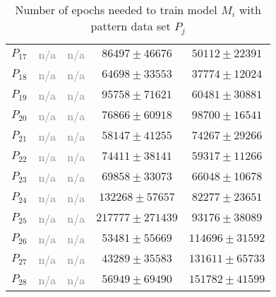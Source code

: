 \documentclass[anon]{CI}
\begin{document}
\begin{table}[H]
\begin{tabular}{ccccc}
				$P_{17}$  & \textcolor{gray}{n/a}  & \textcolor{gray}{n/a}  & $86497\pm46676$  & $50112\pm22391$ \\
				$P_{18}$  & \textcolor{gray}{n/a}  & \textcolor{gray}{n/a}  & $64698\pm33553$  & $37774\pm12024$ \\
				$P_{19}$  & \textcolor{gray}{n/a}  & \textcolor{gray}{n/a}  & $95758\pm71621$  & $60481\pm30881$ \\
				$P_{20}$  & \textcolor{gray}{n/a}  & \textcolor{gray}{n/a}  & $76866\pm60918$  & $98700\pm16541$ \\
				$P_{21}$  & \textcolor{gray}{n/a}  & \textcolor{gray}{n/a}  & $58147\pm41255$  & $74267\pm29266$ \\
				$P_{22}$  & \textcolor{gray}{n/a}  & \textcolor{gray}{n/a}  & $74411\pm38141$  & $59317\pm11266$ \\
				$P_{23}$  & \textcolor{gray}{n/a}  & \textcolor{gray}{n/a}  & $69858\pm33073$  & $66048\pm10678$ \\
				$P_{24}$  & \textcolor{gray}{n/a}  & \textcolor{gray}{n/a}  & $132268\pm57657$  & $82277\pm23651$ \\
				$P_{25}$  & \textcolor{gray}{n/a}  & \textcolor{gray}{n/a}  & $217777\pm271439$  & $93176\pm38089$ \\
				$P_{26}$  & \textcolor{gray}{n/a}  & \textcolor{gray}{n/a}  & $53481\pm55669$  & $114696\pm31592$ \\
				$P_{27}$  & \textcolor{gray}{n/a}  & \textcolor{gray}{n/a}  & $43289\pm35583$  & $131611\pm65733$ \\
				$P_{28}$  & \textcolor{gray}{n/a}  & \textcolor{gray}{n/a}  & $56949\pm69490$  & $151782\pm41599$ \\
				
			\end{tabular}
			\caption{Number of epochs needed to train model $M_i$ with pattern data set $P_j$}
		\end{table}
		
		
		
\end{document}
